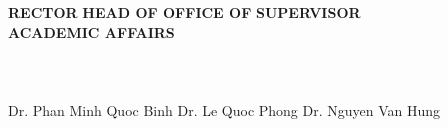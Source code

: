 \documentclass[12pt,a4paper]{report}
\begin{document}
\begingroup
\fontsize{12pt}{12pt}\selectfont
\textbf{RECTOR} \hspace*{120pt} \textbf{HEAD OF OFFICE OF} \hspace*{70pt} \textbf{SUPERVISOR}\\
\hspace*{170pt} \textbf{ACADEMIC AFFAIRS} \hspace*{100pt}
\endgroup
\\
\\
\\
\\
\begingroup
\fontsize{12pt}{12pt}\selectfont
Dr. Phan Minh Quoc Binh \hspace*{50pt} Dr. Le Quoc Phong \hspace*{70pt} Dr. Nguyen Van Hung
\endgroup
\end{document}
